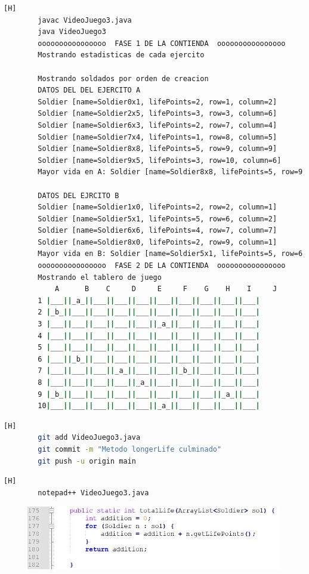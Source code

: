 \documentclass{article}
\begin{document}
	
	\begin{lstlisting}[language=bash,caption={Compilando y probando }][H]
		javac VideoJuego3.java
		java VideoJuego3
		oooooooooooooooo  FASE 1 DE LA CONTIENDA  oooooooooooooooo
		Mostrando estadisticas de cada ejercito
		
		Mostrando soldados por orden de creacion
		DATOS DEL DEL EJERCITO A
		Soldier [name=Soldier0x1, lifePoints=2, row=1, column=2]
		Soldier [name=Soldier2x5, lifePoints=3, row=3, column=6]
		Soldier [name=Soldier6x3, lifePoints=2, row=7, column=4]
		Soldier [name=Soldier7x4, lifePoints=1, row=8, column=5]
		Soldier [name=Soldier8x8, lifePoints=5, row=9, column=9]
		Soldier [name=Soldier9x5, lifePoints=3, row=10, column=6]
		Mayor vida en A: Soldier [name=Soldier8x8, lifePoints=5, row=9, column=9]
		
		DATOS DEL EJRCITO B
		Soldier [name=Soldier1x0, lifePoints=2, row=2, column=1]
		Soldier [name=Soldier5x1, lifePoints=5, row=6, column=2]
		Soldier [name=Soldier6x6, lifePoints=4, row=7, column=7]
		Soldier [name=Soldier8x0, lifePoints=2, row=9, column=1]
		Mayor vida en B: Soldier [name=Soldier5x1, lifePoints=5, row=6, column=2]
		oooooooooooooooo  FASE 2 DE LA CONTIENDA  oooooooooooooooo
		Mostrando el tablero de juego
			A      B    C     D     E     F    G    H    I     J
		1 |___||_a_||___||___||___||___||___||___||___||___|
		2 |_b_||___||___||___||___||___||___||___||___||___|
		3 |___||___||___||___||___||_a_||___||___||___||___|
		4 |___||___||___||___||___||___||___||___||___||___|
		5 |___||___||___||___||___||___||___||___||___||___|
		6 |___||_b_||___||___||___||___||___||___||___||___|
		7 |___||___||___||_a_||___||___||_b_||___||___||___|
		8 |___||___||___||___||_a_||___||___||___||___||___|
		9 |_b_||___||___||___||___||___||___||___||_a_||___|
		10|___||___||___||___||___||_a_||___||___||___||___|
	\end{lstlisting}
	
	\begin{lstlisting}[language=bash,caption={Commit: Metodo longerLife culminado B}][H]
		git add VideoJuego3.java
		git commit -m "Metodo longerLife culminado"			
		git push -u origin main
	\end{lstlisting}
	
	
	\begin{lstlisting}[language=bash,caption={Se implementa el método que retorna la vida total del ejército}][H]
		notepad++ VideoJuego3.java
	\end{lstlisting}
	
	\begin{figure}[H]
		\centering
		\includegraphics[width=1\textwidth,keepaspectratio]{img/7.jpg}
	\end{figure}
	
\end{document}
